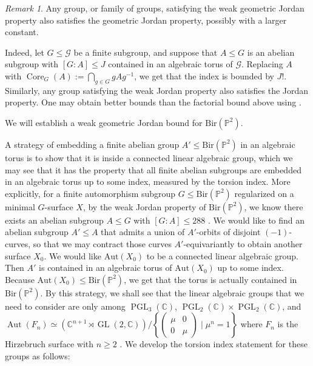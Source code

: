 \documentclass[a4paper,12pt,oneside]{amsart}
\numberwithin{equation}{section}
\theoremstyle{definition}
\theoremstyle{remark}
\newtheorem{remark}[theorem]{Remark}
\newcommand{\PP}{\mathbb{P}}
\newcommand{\Ptwo}{\mathbb{P}^2}
\newcommand{\Bir}{\mathrm{Bir}}
\newcommand{\Aut}{\mathrm{Aut}}
\begin{document}
\begin{remark}
Any group, or family of groups, satisfying the weak geometric Jordan property also satisfies the geometric Jordan property, possibly with a larger constant.

Indeed, let $G \leqslant \mathcal{G}$ be a finite subgroup, and suppose that $A \leqslant G$ is an abelian subgroup with $[G:A]\leq J$ contained in an algebraic torus of $\mathcal{G}$. Replacing $A$ with 
\(
\operatorname{Core}_G(A):=\bigcap_{g\in G} gAg^{-1}
\), we get that the index is bounded by $J!$. Similarly, any group satisfying the weak Jordan property also satisfies the Jordan property. One may obtain better bounds than the factorial bound above using \cite[Theorem 1.7]{yasinsky2023jordanconstantcremonagroup}.
\end{remark}

We will establish a weak geometric Jordan bound for $\Bir(\Ptwo)$.


A strategy of embedding a finite abelian group $A'\leqslant \mathrm{Bir}(\PP^2)$ in an algebraic torus is to show that it is inside a connected linear algebraic group, which we may see that it has the property that all finite abelian subgroups are embedded in an algebraic torus up to some index, measured by the torsion index. More explicitly, for a finite automorphism subgroup $G\leqslant \Bir(\Ptwo)$ regularized on a minimal $G$-surface $X$, by the weak Jordan property of $\Bir(\Ptwo)$, we know there exists an abelian subgroup $A\leqslant G$ with $[G:A]\leq 288$ \cite[Proposition 1.2.3]{prok17}. We would like to find an abelian subgroup $A'\leqslant A$ that admits a union of $A'$-orbits of  disjoint $(-1)$-curves, so that we may contract those curves $A'$-equivariantly to obtain another surface $X_0$. We would like $\Aut(X_0)$ to be a connected linear algebraic group. Then $A'$ is contained in an algebraic torus of $\mathrm{Aut}(X_0)$ up to some index. Because $\mathrm{Aut}(X_0) \leqslant \mathrm{Bir}(\mathbb{P}^2)$, we get that the torus is actually contained in $\mathrm{Bir}(\mathbb{P}^2)$. By this strategy, we shall see that the linear algebraic groups that we need to consider are only among $\operatorname{PGL}_3(\mathbb{C})$, $\operatorname{PGL}_2(\mathbb{C})\times\operatorname{PGL}_2(\mathbb{C})$, and $\operatorname{Aut}(F_n) \simeq \left(\mathbb{C}^{n+1} \rtimes \operatorname{GL}(2,\mathbb{C})\right)\Big/ \left\{ \begin{pmatrix}\mu & 0 \\ 0 & \mu\end{pmatrix} \mid \mu^n = 1 \right\}$ where $F_n$ is the Hirzebruch surface with $n\geq 2$ \cite[Exercise 2]{BlancCremonaNotes}. We develop the torsion index statement for these groups as follows:
\end{document}
